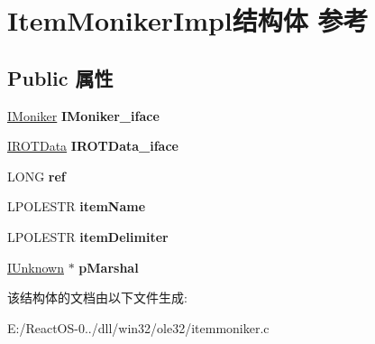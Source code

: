 \hypertarget{struct_item_moniker_impl}{}\section{Item\+Moniker\+Impl结构体 参考}
\label{struct_item_moniker_impl}
\subsection*{Public 属性}
\begin{DoxyCompactItemize}
\item 
\mbox{\label{struct_item_moniker_impl_ac0677fc050ac292683837b7c4bbad828}} 
\hyperlink{interface_i_moniker}{I\+Moniker} {\bfseries I\+Moniker\+\_\+iface}
\item 
\mbox{\label{struct_item_moniker_impl_a93783b9960855d0a0ac7cf0ed3ed551e}} 
\hyperlink{interface_i_r_o_t_data}{I\+R\+O\+T\+Data} {\bfseries I\+R\+O\+T\+Data\+\_\+iface}
\item 
\mbox{\label{struct_item_moniker_impl_aa308fc191405bbb2c01e22581291072b}} 
L\+O\+NG {\bfseries ref}
\item 
\mbox{\label{struct_item_moniker_impl_ad76a8305fadc35ad79bc4d562b1c0a4b}} 
L\+P\+O\+L\+E\+S\+TR {\bfseries item\+Name}
\item 
\mbox{\label{struct_item_moniker_impl_a4418300bbc0c1676c9bcc33e9c57a6ce}} 
L\+P\+O\+L\+E\+S\+TR {\bfseries item\+Delimiter}
\item 
\mbox{\label{struct_item_moniker_impl_aceac42ed34743a474c52ed6b7a9a5fe3}} 
\hyperlink{interface_i_unknown}{I\+Unknown} $\ast$ {\bfseries p\+Marshal}
\end{DoxyCompactItemize}


该结构体的文档由以下文件生成\+:\begin{DoxyCompactItemize}
\item 
E\+:/\+React\+O\+S-\/0../dll/win32/ole32/itemmoniker.\+c\end{DoxyCompactItemize}
